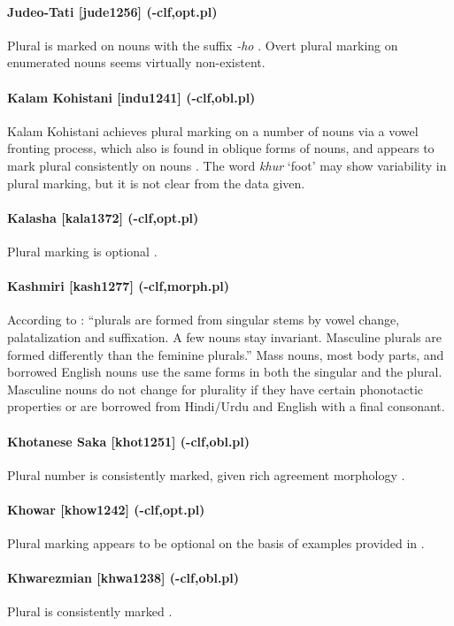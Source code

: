 \paragraph{Judeo-Tati [jude1256] (-clf,opt.pl)}
Plural is marked on nouns with the suffix {\it -ho} \citep[79]{Authier2012}. Overt plural marking on enumerated nouns seems virtually non-existent.
\paragraph{Kalam Kohistani [indu1241] (-clf,obl.pl)}
Kalam Kohistani achieves plural marking on a number of nouns via a vowel fronting process, which also is found in oblique forms of nouns, and appears to mark plural consistently on nouns \citep[21]{BaartSagar2004}. The word {\it khur} `foot' may show variability in plural marking, but it is not clear from the data given.
\paragraph{Kalasha [kala1372] (-clf,opt.pl)}
Plural marking is optional \citep[35--6]{Petersen2015}.
\paragraph{Kashmiri [kash1277] (-clf,morph.pl)}
According to \citet[190ff.]{WaliKoul1996}: ``plurals are formed from singular stems by vowel change, palatalization and suffixation. A few nouns stay invariant. Masculine plurals are formed differently than the feminine plurals.'' Mass nouns, most body parts, and borrowed English nouns use the same forms in both the singular and the plural. Masculine nouns do not change for plurality if they have certain phonotactic properties or are borrowed from Hindi/Urdu and English with a final consonant.
\paragraph{Khotanese Saka [khot1251] (-clf,obl.pl)}
Plural number is consistently marked, given rich agreement morphology \citep{Emmerick1989}.
\paragraph{Khowar [khow1242] (-clf,opt.pl)}
Plural marking appears to be optional on the basis of examples provided in \citealt{EndresenKristiansen1981}.
\paragraph{Khwarezmian [khwa1238] (-clf,obl.pl)}
Plural is consistently marked \citep{DurkinMeisterernst2009}.
